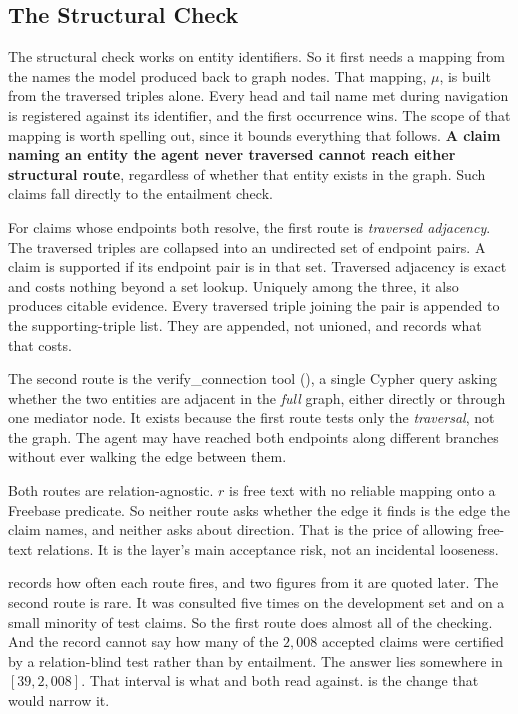 \subsection{The Structural Check}\label{sec:structural-check}

The structural check works on entity identifiers. So it first needs a
mapping from the names the model produced back to
graph nodes. That mapping, $\mu$, is built from the traversed triples alone.
Every head and tail name met during navigation is registered against its
identifier, and the first occurrence wins. The scope of that mapping is worth
spelling out, since it bounds everything that follows. \textbf{A claim naming an
entity the agent never traversed cannot reach either structural route},
regardless of whether that entity exists in the graph. Such claims fall directly
to the entailment check.

For claims whose endpoints both resolve, the first route is \emph{traversed
adjacency}. The traversed triples are collapsed into
an undirected set of endpoint pairs. A claim is supported if its endpoint pair
is in that set. Traversed adjacency is exact and costs nothing beyond a set
lookup. Uniquely among the three, it also produces citable evidence. Every
traversed triple joining the pair is appended to the supporting-triple list.
They are appended, not unioned, and  records what that
costs.

The second route is the \textsf{verify\_connection} tool (), a
single Cypher query asking whether the two entities are adjacent in the
\emph{full} graph, either directly or through one mediator node. It exists
because the first route tests only the \emph{traversal}, not the graph. The
agent may have reached both endpoints along different branches without ever
walking the edge between them.

Both routes are relation-agnostic. $r$ is free text with no reliable mapping
onto a Freebase predicate. So neither route asks whether the edge it finds is
the edge the claim names, and neither asks about direction. That is the price of
allowing free-text relations. It is the layer's main acceptance risk, not an
incidental looseness.

 records how often each route fires, and two figures
from it are quoted later. The second route is rare. It was consulted five times
on the development set and on a small minority of test claims. So the first
route does almost all of the checking. And the record cannot say how many of the
$2{,}008$ accepted claims were certified by a relation-blind test rather than by
entailment. The answer lies somewhere in $[39, 2{,}008]$. That interval is what
 and  both read against.
 is the change that would narrow it.

